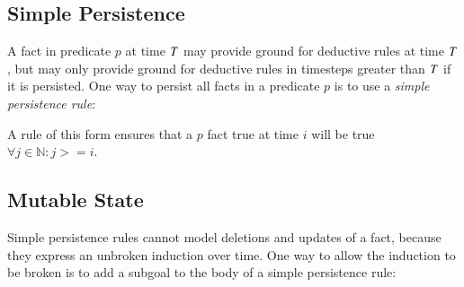 


\subsection{Simple Persistence}
%
A fact in predicate $p$ at time $\DT$ may provide ground for deductive rules at
time $\DT$, but may only provide ground for deductive rules in timesteps
greater than $\DT$ if it is persisted.  One way to persist all facts in a
predicate $p$ is to use a {\em simple persistence rule}:


\noindent A rule of this form ensures that a $p$ fact true at time $i$ will be
true $\forall j \in \mathbb{N} : j >= i$.


\subsection{Mutable State}
\label{sec:mutable}

Simple persistence rules cannot model deletions and updates of a fact, because
they express an unbroken induction over time.  One way to allow the induction
to be broken is to add a  subgoal to the body of a simple
persistence rule:

